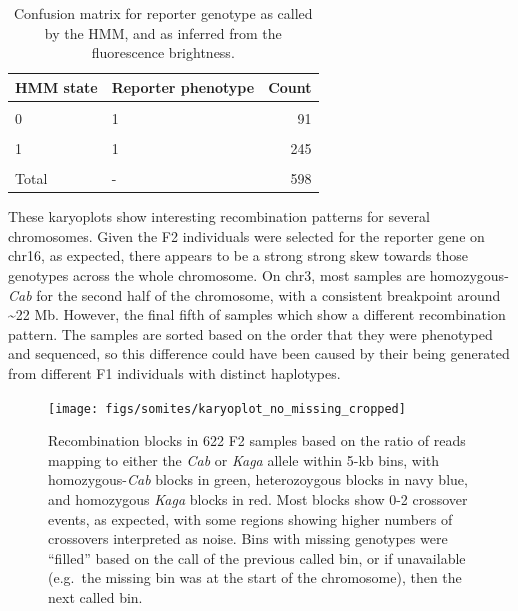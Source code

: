 \documentclass[
]{book}
\begin{document}
\begin{table}

\caption{\label{tab:reporter-conc-tbl}Confusion matrix for reporter genotype as called by the HMM, and as inferred from the fluorescence brightness.}
\centering
\begin{tabular}[t]{llr}
\toprule
HMM state & Reporter phenotype & Count\\
\midrule
\cellcolor{gray!6}{0} & \cellcolor{gray!6}{0} & \cellcolor{gray!6}{252}\\
0 & 1 & 91\\
\cellcolor{gray!6}{1} & \cellcolor{gray!6}{0} & \cellcolor{gray!6}{9}\\
1 & 1 & 245\\
\cellcolor{gray!6}{2} & \cellcolor{gray!6}{1} & \cellcolor{gray!6}{1}\\
\addlinespace
Total & - & 598\\
\bottomrule
\end{tabular}
\end{table}

These karyoplots show interesting recombination patterns for several chromosomes. Given the F2 individuals were selected for the reporter gene on chr16, as expected, there appears to be a strong strong skew towards those genotypes across the whole chromosome. On chr3, most samples are homozygous-\emph{Cab} for the second half of the chromosome, with a consistent breakpoint around \textasciitilde22 Mb. However, the final fifth of samples which show a different recombination pattern. The samples are sorted based on the order that they were phenotyped and sequenced, so this difference could have been caused by their being generated from different F1 individuals with distinct haplotypes.



\begin{figure}
\texttt{[image: figs/somites/karyoplot\_no\_missing\_cropped]} \caption{Recombination blocks in 622 F2 samples based on the ratio of reads mapping to either the \emph{Cab} or \emph{Kaga} allele within 5-kb bins, with homozygous-\emph{Cab} blocks in green, heterozoygous blocks in navy blue, and homozygous \emph{Kaga} blocks in red. Most blocks show 0-2 crossover events, as expected, with some regions showing higher numbers of crossovers interpreted as noise. Bins with missing genotypes were ``filled'' based on the call of the previous called bin, or if unavailable (e.g.~the missing bin was at the start of the chromosome), then the next called bin.}\label{fig:karyo-no-missing}
\end{figure}
\end{document}
